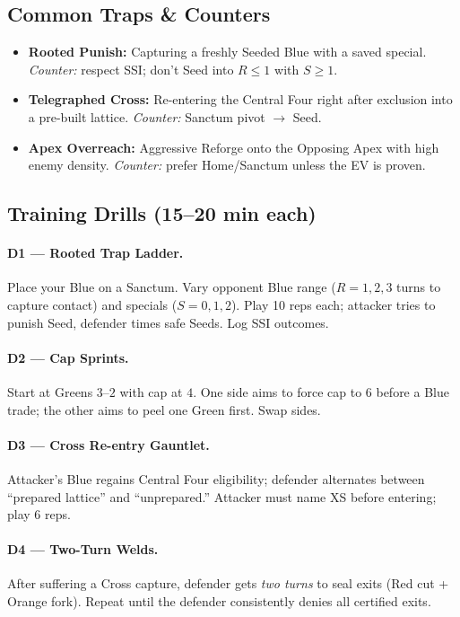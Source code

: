 \documentclass[11pt]{article}
\begin{document}
\bigskip

\subsection*{Common Traps \& Counters}
\begin{itemize}
  \item \textbf{Rooted Punish:} Capturing a freshly Seeded Blue with a saved special. \emph{Counter:} respect SSI; don’t Seed into $R\!\le\!1$ with $S\!\ge\!1$.
  \item \textbf{Telegraphed Cross:} Re-entering the Central Four right after exclusion into a pre-built lattice. \emph{Counter:} Sanctum pivot $\rightarrow$ Seed.
  \item \textbf{Apex Overreach:} Aggressive Reforge onto the Opposing Apex with high enemy density. \emph{Counter:} prefer Home/Sanctum unless the EV is proven.
\end{itemize}

\subsection*{Training Drills (15–20 min each)}
\paragraph{D1 — Rooted Trap Ladder.}
Place your Blue on a Sanctum. Vary opponent Blue range ($R\!=\!1,2,3$ turns to capture contact) and specials ($S\!=\!0,1,2$). Play 10 reps each; attacker tries to punish Seed, defender times safe Seeds. Log SSI outcomes.

\paragraph{D2 — Cap Sprints.}
Start at Greens $3$–$2$ with cap at $4$. One side aims to force cap to $6$ before a Blue trade; the other aims to peel one Green first. Swap sides.

\paragraph{D3 — Cross Re-entry Gauntlet.}
Attacker’s Blue regains Central Four eligibility; defender alternates between “prepared lattice” and “unprepared.” Attacker must name XS before entering; play 6 reps.

\paragraph{D4 — Two-Turn Welds.}
After suffering a Cross capture, defender gets \emph{two turns} to seal exits (Red cut + Orange fork). Repeat until the defender consistently denies all certified exits.
\end{document}
